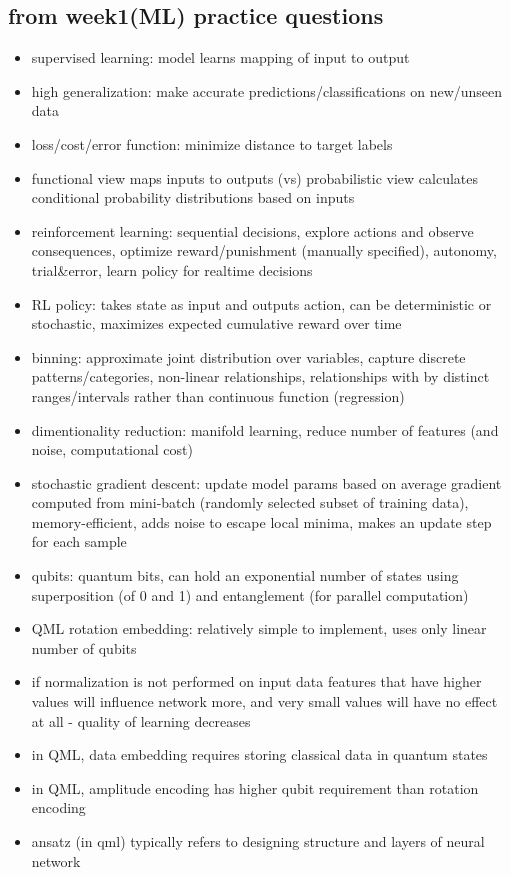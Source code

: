 \documentclass[10pt]{article}
\begin{document}
\subsection*{from week1(ML) practice questions}
\begin{itemize}[label=\(\star\), leftmargin=1em, itemsep=-0.3em]
    \item supervised learning: model learns mapping of input to output
    \item high generalization: make accurate predictions/classifications on new/unseen data
    \item loss/cost/error function: minimize distance to target labels
    \item functional view maps inputs to outputs (vs) probabilistic view calculates conditional probability distributions based on inputs
    \item reinforcement learning: sequential decisions, explore actions and observe consequences, optimize reward/punishment (manually specified), autonomy, trial\&error, learn policy for realtime decisions
    \item RL policy: takes state as input and outputs action, can be deterministic or stochastic, maximizes expected cumulative reward over time
    \item binning: approximate joint distribution over variables, capture discrete patterns/categories, non-linear relationships, relationships with by distinct ranges/intervals rather than continuous function (regression)
    \item dimentionality reduction: manifold learning, reduce number of features (and noise, computational cost)
    \item stochastic gradient descent: update model params based on average gradient computed from mini-batch (randomly selected subset of training data), memory-efficient, adds noise to escape local minima, makes an update step for each sample
    \item qubits: quantum bits, can hold an exponential number of states using superposition (of 0 and 1) and entanglement (for parallel computation)
    \item QML rotation embedding: relatively simple to implement, uses only linear number of qubits
    \item if normalization is not performed on input data features that have higher values will influence network more, and very small values will have no effect at all - quality of learning decreases
    \item in QML, data embedding requires storing classical data in quantum states
    \item in QML, amplitude encoding  has higher qubit requirement than rotation encoding
    \item ansatz (in qml) typically refers to designing structure and layers of neural network
\end{itemize}
\end{document}
